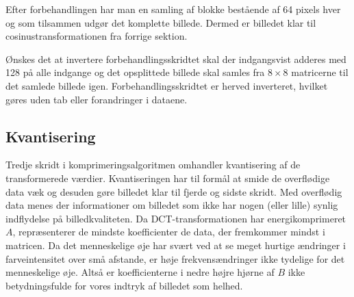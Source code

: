 Efter forbehandlingen har man en samling af blokke bestående af 64 pixels hver og som tilsammen udgør det komplette billede. Dermed er billedet klar til cosinustransformationen fra forrige sektion.

Ønskes det at invertere forbehandlingsskridtet skal der indgangsvist adderes med 128 på alle indgange og det opsplittede billede skal samles fra $8 \times 8$ matricerne til det samlede billede igen. Forbehandlingsskridtet er herved inverteret, hvilket gøres uden tab eller forandringer i dataene.

\subsection{Kvantisering}\label{sec:kvantisering}
Tredje skridt i komprimeringsalgoritmen omhandler kvantisering af de transformerede værdier. Kvantiseringen har til formål at smide de overflødige data væk og desuden gøre billedet klar til fjerde og sidste skridt. Med overflødig data menes der informationer om billedet som ikke har nogen (eller lille) synlig indflydelse på billedkvaliteten. Da DCT-transformationen har energikomprimeret $A$, repræsenterer de mindste koefficienter de data, der fremkommer mindst i matricen. Da det menneskelige øje har svært ved at se meget hurtige ændringer i farveintensitet over små afstande, er høje frekvensændringer ikke tydelige for det menneskelige øje. Altså er koefficienterne i nedre højre hjørne af $B$ ikke betydningsfulde for vores indtryk af billedet som helhed.

